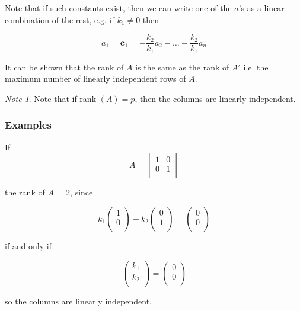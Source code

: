 \documentclass[12pt,a4paper]{article}
\theoremstyle{regla}
\theoremstyle{remark}
\newtheorem{notes}{Note}[section]
\theoremstyle{definition}
\theoremstyle{nonumberbreak}
\begin{document}
Note that if such constants exist, then we can write one of the $a$'s as a linear combination of the rest, e.g. if $k_1 \neq 0$ then

$$ a_1=\mathbf{c_1} =  -\frac{k_2}{k_1} a_2 - \ldots - \frac{k_2}{k_1} a_n $$

It can be shown that the rank of  $A$ is the same as the rank of  $A'$ i.e. the maximum number of linearly independent rows of  $A$. 
\begin{notes}
Note that if rank $(A)= p$, then the columns are linearly independent.
\end{notes}

\subsubsection{Examples}
\begin{xmpl}

If \[A= 
  \left[ 
   \begin{array}{cc}
     1 & 0 \\
     0 & 1 \\
   \end{array}
  \right]\]

the rank of  $A$ = 2, since

 \[  k_1
  \left(
   \begin{array}{cc}
     1 \\
     0 \\
   \end{array}
  \right) +  k_2
  \left(
   \begin{array}{cc}
     0 \\
     1 \\
   \end{array}
  \right) =  \left(
    \begin{array}{cc}
      0 \\
      0 \\
    \end{array}
   \right) \]

if and only if  

 \[ \left( 
  \begin{array}{cc}
     k_1 \\
     k_2 \\
   \end{array}
  \right) =   \left(
    \begin{array}{cc}
      0 \\
      0 \\
    \end{array}
   \right) \]

so the columns are linearly independent.
\end{xmpl}
\end{document}
